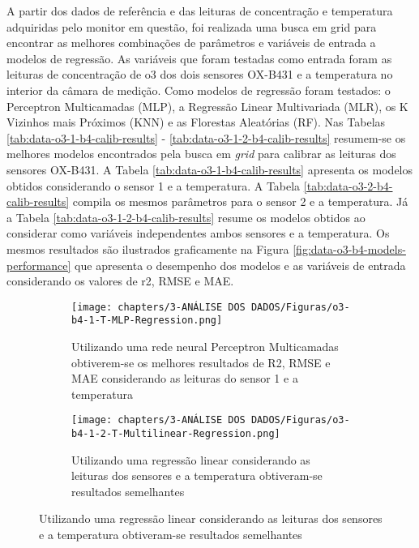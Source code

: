 A partir dos dados de referência e das leituras de concentração e temperatura adquiridas pelo monitor em questão, foi realizada uma busca em grid para encontrar as melhores combinações de parâmetros e variáveis de entrada a modelos de regressão. As variáveis que foram testadas como entrada foram as leituras de concentração de \acrshort{o3} dos dois sensores OX-B431 e a temperatura no interior da câmara de medição. Como modelos de regressão foram testados: o Perceptron Multicamadas (MLP), a Regressão Linear Multivariada (MLR), os K Vizinhos mais Próximos (KNN) e as Florestas Aleatórias (RF). Nas Tabelas \ref{tab:data-o3-1-b4-calib-results} - \ref{tab:data-o3-1-2-b4-calib-results} resumem-se os melhores modelos encontrados pela busca em \textit{grid} para calibrar as leituras dos sensores OX-B431. A Tabela \ref{tab:data-o3-1-b4-calib-results} apresenta os modelos obtidos considerando o sensor 1 e a temperatura. A Tabela \ref{tab:data-o3-2-b4-calib-results} compila os mesmos parâmetros para o sensor 2 e a temperatura. Já a Tabela \ref{tab:data-o3-1-2-b4-calib-results} resume os modelos obtidos ao considerar como variáveis independentes ambos sensores e a temperatura. Os mesmos resultados são ilustrados graficamente na Figura \ref{fig:data-o3-b4-models-performance} que apresenta o desempenho dos modelos e as variáveis de entrada considerando os valores de r2, RMSE e MAE.

\begin{figure}[h!]
    \centering
    \caption{Gráfico de dispersão das leituras dos sensores de \acrshort{o3} OX-B431 e a estação de referência após aplicar modelos de regressão considerando a temperatura}
    \begin{subfigure}{0.49\textwidth}
        \texttt{[image: chapters/3-ANÁLISE DOS DADOS/Figuras/o3-b4-1-T-MLP-Regression.png]}
        \caption{Utilizando uma rede neural Perceptron Multicamadas obtiverem-se os melhores resultados de R2, RMSE e MAE considerando as leituras do sensor 1 e a temperatura}
        \label{fig:data-o3-1-T-reference-corr-MLP}
    \end{subfigure}
    \hfill
    \begin{subfigure}{0.49\textwidth}
        \texttt{[image: chapters/3-ANÁLISE DOS DADOS/Figuras/o3-b4-1-2-T-Multilinear-Regression.png]}
        \caption{Utilizando uma regressão linear considerando as leituras dos sensores e a temperatura obtiveram-se resultados semelhantes}
        \label{fig:data-o3-1-2-T-reference-corr-MLR}
    \end{subfigure}
\end{figure}

